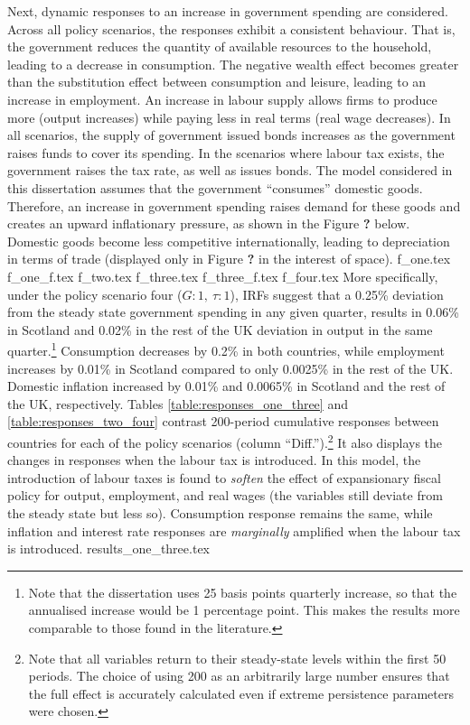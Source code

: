 Next, dynamic responses to an increase in government spending are considered. Across all policy scenarios, the responses exhibit a consistent behaviour. That is, the government reduces the quantity of available resources to the household, leading to a decrease in consumption. The negative wealth effect becomes greater than the substitution effect between consumption and leisure, leading to an increase in employment. An increase in labour supply allows firms to produce more (output increases) while paying less in real terms (real wage decreases). In all scenarios, the supply of government issued bonds increases as the government raises funds to cover its spending. In the scenarios where labour tax exists, the government raises the tax rate, as well as issues bonds. The model considered in this dissertation assumes that the government ``consumes'' domestic goods. Therefore, an increase in government spending raises demand for these goods and creates an upward inflationary pressure, as shown in the Figure \textbf{?} below. Domestic goods become less competitive internationally, leading to depreciation in terms of trade (displayed only in Figure \textbf{?} in the interest of space). 
{f_one.tex}
{f_one_f.tex}
{f_two.tex}
{f_three.tex}
{f_three_f.tex}
{f_four.tex}
More specifically, under the policy scenario four ($G:1,\ \tau:1$), IRFs suggest that a 0.25\% deviation from the steady state government spending in any given quarter, results in 0.06\% in Scotland and 0.02\% in the rest of the UK deviation in output in the same quarter.\footnote{Note that the dissertation uses 25 basis points quarterly increase, so that the annualised increase would be 1 percentage point. This makes the results more comparable to those found in the literature.} Consumption decreases by 0.2\% in both countries, while employment increases by 0.01\% in Scotland compared to only 0.0025\% in the rest of the UK. Domestic inflation increased by 0.01\% and 0.0065\% in Scotland and the rest of the UK, respectively. Tables \ref{table:responses_one_three} and \ref{table:responses_two_four} contrast 200-period cumulative responses between countries for each of the policy scenarios (column ``Diff.'').\footnote{Note that all variables return to their steady-state levels within the first 50 periods. The choice of using 200 as an arbitrarily large number ensures that the full effect is accurately calculated even if extreme persistence parameters were chosen.} It also displays the changes in responses when the labour tax is introduced. In this model, the introduction of labour taxes is found to \textit{soften} the effect of expansionary fiscal policy for output, employment, and real wages (the variables still deviate from the steady state but less so). Consumption response remains the same, while inflation and interest rate responses are \textit{marginally} amplified when the labour tax is introduced.
{results_one_three.tex}

